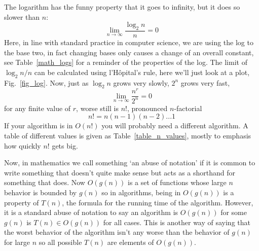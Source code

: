 \documentclass[11pt,a4paper]{scrartcl}
\begin{document}
The logarithm has the funny property that it goes to infinity, but it
does so slower than $n$:
\begin{equation}
\lim_{n\rightarrow \infty}\frac{\log_2{n}}{n}=0
\end{equation}
Here, in line with standard practice in computer science, we are using
the log to the base two, in fact changing bases only causes a change
of an overall constant, see Table~\ref{math_logs} for a reminder of
the properties of the log. The limit of $\log_2{n}/n$ can be
calculated using l'H\^{o}pital's rule, here we'll just look at a plot,
Fig.~\ref{fig_log}. Now, just as $\log_2{n}$ grows very slowly, $2^n$
grows very fast,
\begin{equation}
\lim_{n\rightarrow \infty}\frac{n^r}{2^n}=0
\end{equation}
for any finite value of $r$, worse still is $n!$, pronounced $n$-factorial
\begin{equation}
n!=n(n-1)(n-2) . . . 1
\end{equation}
If your algorithm is in $O(n!)$ you will probably need a different
algorithm. A table of different values is given as
Table~\ref{table_n_values}, mostly to emphasis how quickly $n!$ gets
big.

Now, in mathematics we call something \lq{}an abuse of notation\rq{}
if it is common to write something that doesn't quite make sense but
acts as a shorthand for something that does. Now $O(g(n))$ is a set of
functions whose large $n$ behavior is bounded by $g(n)$ so in
algorithms, being in $O(g(n))$ is a property of $T(n)$, the formula
for the running time of the algorithm. However, it is a standard abuse
of notation to say an algorithm is $O(g(n))$ for some $g(n)$ is
$T(n)\in O(g(n))$ for all cases. This is another way of saying that
the worst behavior of the algorithm isn't any worse than the behavior
of $g(n)$ for large $n$ so all possible $T(n)$ are elements of
$O(g(n))$.
\end{document}

